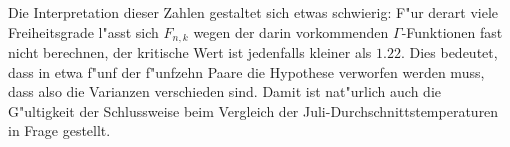 Die Interpretation dieser Zahlen gestaltet sich etwas schwierig: F"ur derart
viele Freiheitsgrade l"asst sich $F_{n,k}$ wegen der darin
vorkommenden $\Gamma$-Funktionen fast nicht berechnen, der kritische Wert
ist jedenfalls kleiner als $1.22$.
Dies bedeutet, dass in etwa f"unf der
f"unfzehn Paare die Hypothese verworfen werden muss, dass also die Varianzen
verschieden sind.
Damit ist nat"urlich auch die G"ultigkeit der Schlussweise
beim Vergleich der Juli-Durchschnittstemperaturen in Frage gestellt.

